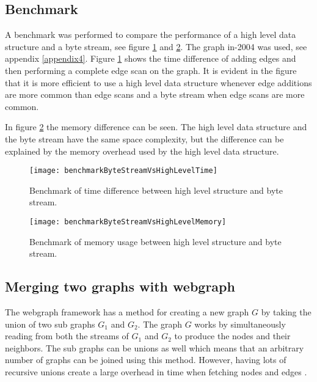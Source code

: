 \subsection{Benchmark}
A benchmark was performed to compare the performance of a high level data structure and a byte stream, see figure \ref{fig:benchmarkByteStreamVsHighLevelTime} and \ref{fig:benchmarkByteStreamVsHighLevelMemory}. The graph in-2004 was used, see appendix \ref{appendix4}. Figure \ref{fig:benchmarkByteStreamVsHighLevelTime} shows the time difference of adding edges and then performing a complete edge scan on the graph. It is evident in the figure that it is more efficient to use a high level data structure whenever edge additions are more common than edge scans and a byte stream when edge scans are more common. 

In figure \ref{fig:benchmarkByteStreamVsHighLevelMemory} the memory difference can be seen. The high level data structure and the byte stream have the same space complexity, but the difference can be explained by the memory overhead used by the high level data structure. 

\begin{figure}[h]
\centering
\texttt{[image: benchmarkByteStreamVsHighLevelTime]}    
\captionsetup{justification=centering}
\caption {Benchmark of time difference between high level structure and byte stream. }
\label{fig:benchmarkByteStreamVsHighLevelTime}
\end{figure}

\begin{figure}[h]
\centering
\texttt{[image: benchmarkByteStreamVsHighLevelMemory]}    
\captionsetup{justification=centering}
\caption {Benchmark of memory usage between high level structure and byte stream. }
\label{fig:benchmarkByteStreamVsHighLevelMemory}
\end{figure}


\subsection{Merging two graphs with webgraph}
The webgraph framework has a method for creating a new graph $G$ by taking the union of two sub graphs $G_1$ and $G_2$. The graph $G$ works by simultaneously reading from both the streams of $G_1$ and $G_2$ to produce the nodes and their neighbors. The sub graphs can be unions as well which means that an arbitrary number of graphs can be joined using this method. However, having lots of recursive unions create a large overhead in time when fetching nodes and edges \cite{webgraph}. 

